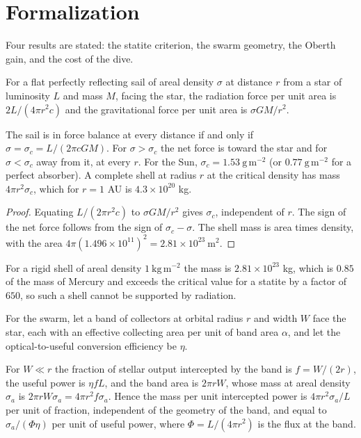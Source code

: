 \section*{Formalization}

Four results are stated: the statite criterion, the swarm geometry, the Oberth gain, and the cost of the dive.

For a flat perfectly reflecting sail of areal density $\sigma$ at distance $r$ from a star of luminosity $L$ and mass $M$, facing the star, the radiation force per unit area is $2L/(4\pi r^2c)$ and the gravitational force per unit area is $\sigma GM/r^2$.

\begin{proposition}
The sail is in force balance at every distance if and only if $\sigma=\sigma_c=L/(2\pi cGM)$. For $\sigma>\sigma_c$ the net force is toward the star and for $\sigma<\sigma_c$ away from it, at every $r$. For the Sun, $\sigma_c=1.53\ \mathrm{g\,m^{-2}}$ (or $0.77\ \mathrm{g\,m^{-2}}$ for a perfect absorber). A complete shell at radius $r$ at the critical density has mass $4\pi r^2\sigma_c$, which for $r=1$ AU is $4.3\times10^{20}$ kg.
\end{proposition}

\begin{proof}
Equating $L/(2\pi r^2c)$ to $\sigma GM/r^2$ gives $\sigma_c$, independent of $r$. The sign of the net force follows from the sign of $\sigma_c-\sigma$. The shell mass is area times density, with the area $4\pi(1.496\times10^{11})^2=2.81\times10^{23}\ \mathrm{m^2}$.
\end{proof}

For a rigid shell of areal density $1\ \mathrm{kg\,m^{-2}}$ the mass is $2.81\times10^{23}$ kg, which is $0.85$ of the mass of Mercury and exceeds the critical value for a statite by a factor of $650$, so such a shell cannot be supported by radiation.

For the swarm, let a band of collectors at orbital radius $r$ and width $W$ face the star, each with an effective collecting area per unit of band area $\alpha$, and let the optical-to-useful conversion efficiency be $\eta$.

\begin{proposition}
For $W\ll r$ the fraction of stellar output intercepted by the band is $f=W/(2r)$, the useful power is $\eta fL$, and the band area is $2\pi rW$, whose mass at areal density $\sigma_a$ is $2\pi rW\sigma_a=4\pi r^2f\sigma_a$. Hence the mass per unit intercepted power is $4\pi r^2\sigma_a/L$ per unit of fraction, independent of the geometry of the band, and equal to $\sigma_a/(\Phi\eta)$ per unit of useful power, where $\Phi=L/(4\pi r^2)$ is the flux at the band.
\end{proposition}

